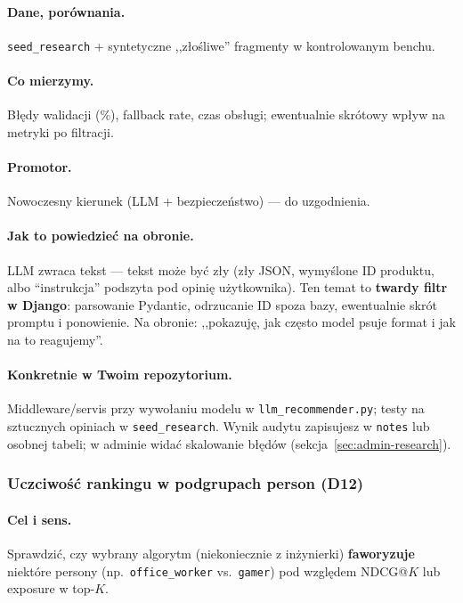 \documentclass[a4paper,11pt]{article}
\newcommand{\code}[1]{\texttt{\small #1}}
\begin{document}
\paragraph{Dane, porównania.}
\texttt{seed\_research} + syntetyczne ,,złośliwe'' fragmenty w kontrolowanym benchu.

\paragraph{Co mierzymy.}
Błędy walidacji (\%), fallback rate, czas obsługi; ewentualnie skrótowy wpływ na metryki po filtracji.

\paragraph{Promotor.}
Nowoczesny kierunek (LLM + bezpieczeństwo) --- do uzgodnienia.

\paragraph{Jak to powiedzieć na obronie.}
LLM zwraca tekst --- tekst może być zły (zły JSON, wymyślone ID produktu, albo ``instrukcja'' podszyta pod opinię użytkownika). Ten temat to \textbf{twardy filtr w Django}: parsowanie Pydantic, odrzucanie ID spoza bazy, ewentualnie skrót promptu i ponowienie. Na obronie: ,,pokazuję, jak często model psuje format i jak na to reagujemy''.

\paragraph{Konkretnie w Twoim repozytorium.}
Middleware/servis przy wywołaniu modelu w \code{llm\_recommender.py}; testy na sztucznych opiniach w \texttt{seed\_research}. Wynik audytu zapisujesz w \code{notes} lub osobnej tabeli; w adminie widać skalowanie błędów (sekcja~\ref{sec:admin-research}).

\subsubsection{Uczciwość rankingu w podgrupach person (\textbf{D12})}

\paragraph{Cel i sens.}
Sprawdzić, czy wybrany algorytm (niekoniecznie z inżynierki) \textbf{faworyzuje} niektóre persony (np.\ \texttt{office\_worker} vs.\ \texttt{gamer}) pod względem NDCG@$K$ lub exposure w top-$K$.
\end{document}
